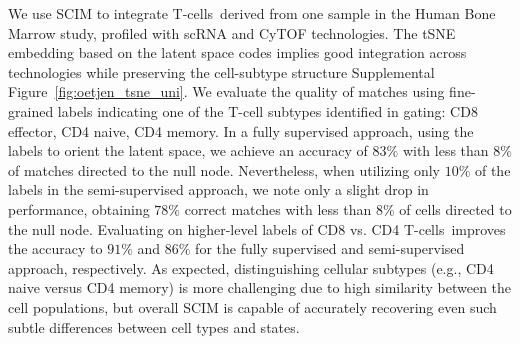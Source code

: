 We use SCIM to integrate T-cells~derived from one sample in the Human Bone Marrow study, profiled with scRNA and CyTOF technologies.
The tSNE embedding based on the latent space codes implies good integration across technologies while preserving the cell-subtype structure Supplemental Figure~\ref{fig:oetjen_tsne_uni}.
We evaluate the quality of matches using fine-grained labels indicating one of the T-cell subtypes identified in gating: CD8 effector, CD4 naive, CD4 memory.
In a fully supervised approach, using the labels to orient the latent space, we achieve an accuracy of $83\%$ with  less than $8\%$ of matches directed to the null node.
Nevertheless, when utilizing only $10\%$ of the labels in the semi-supervised approach, we note only a slight drop in performance, obtaining $78\%$ correct matches with less than $8\%$ of cells directed to the null node.
Evaluating on higher-level labels of CD8 vs.
CD4 T-cells~improves the accuracy to $91\%$ and $86\%$ for the fully supervised and semi-supervised approach, respectively.
As expected, distinguishing cellular subtypes (e.g., CD4 naive versus CD4 memory) is more challenging due to high similarity between the cell populations, but overall SCIM is capable of accurately recovering even such subtle differences between cell types and states.

